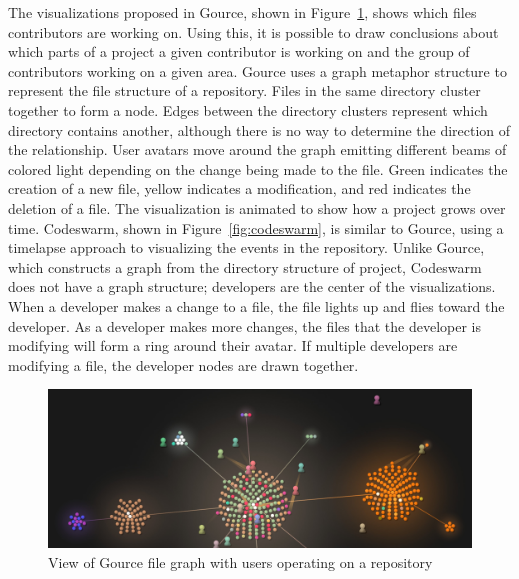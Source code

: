 The visualizations proposed in Gource\cite{Caudwell2010}, shown in
Figure~\ref{fig:gource_view}, shows which files contributors are working
on.
Using this, it is possible to draw conclusions about which parts of a
project a given contributor is working on and the group of contributors
working on a given area. Gource uses a graph metaphor structure to
represent the file structure of a repository. Files in the same
directory cluster together to form a node. Edges between the directory
clusters represent which directory contains another, although there is
no way to determine the direction of the relationship.
User avatars move around the graph emitting different beams of colored
light depending on the change being made to the file.
Green indicates the creation of a new
file, yellow indicates a modification, and red indicates the deletion of
a file. The visualization is animated to show how a project grows over
time. Codeswarm\cite{ogawa09}, shown in Figure~\ref{fig:codeswarm}, is
similar to Gource, using a timelapse approach to visualizing the events
in the repository.
Unlike Gource, which constructs a graph from the directory structure
of project, Codeswarm does not have a graph structure;
developers are the center of the visualizations.
When a developer makes a change to a file, the file lights up and
flies toward the developer.
As a developer makes more changes, the files that the developer is
modifying will form a ring around their avatar.
If multiple developers are modifying a file, the developer nodes
are drawn together.

\begin{figure}[htpb]
  \centering
  \includegraphics[width=0.8\linewidth]{./Figures/introduction/gource-linux.jpg}
  \caption{View of Gource file graph with users operating on a
    repository\cite{Caudwell2010}}
  \label{fig:gource_view}
\end{figure}

